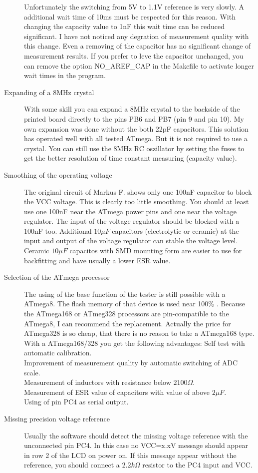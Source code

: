 \begin{description}
Unfortunately the switching from 5V to 1.1V reference is very slowly. A additional
wait time of 10ms must be respected for this reason.
With changing the capacity value to 1nF this wait time can be reduced significant.
I have not noticed any degration of measurement quality with this change.
Even a removing of the capacitor has no significant change of measurement results.
If you prefer to leve the capacitor unchanged, you can remove the option NO\_AREF\_CAP
in the Makefile to activate longer wait times in the program.
\item[Expanding of a 8MHz crystal]
With some skill you can expand a 8MHz crystal to the backside of the printed board
directly to the pins PB6 and PB7 (pin 9 and pin 10).
My own expansion was done without the both 22pF capacitors.
This solution has operated well with all tested ATmega.
But it is not required to use a crystal. You can still use the 8MHz RC oszillator
by setting the fuses to get the better resolution of time constant measuring (capacity value).
\item[Smoothing of the operating voltage]
The original circuit of Markus F. shows only one 100nF capacitor to block the VCC voltage.
This is clearly too little smoothing. You should at least use one 100nF near the ATmega power pins
and one near the voltage regulator. The input of the voltage regulator should be
blocked with a 100nF too.
Additional \(10\mu F\) capacitors (electrolytic or ceramic) at the input and
output of the voltage regulator can stable the voltage level.
Ceramic \(10\mu F\) capacitos with SMD mounting form are easier to use for backfitting
and have usually a lower ESR value. 
\item[Selection of the ATmega processor]
The using of the base function of the tester is still possible with a ATmega8.
The flash memory of that device is used near 100\% .
Because the ATmega168 or ATmeg328 processors are pin-compatible to the ATmega8,
I can recommend the replacement.
Actually the price for ATmega328 is so cheap, that there is no reason to take
a ATmega168 type.
With a ATmega168/328 you get the following advantages:
Self test with automatic calibration.\\
Improvement of measurement quality by automatic switching of ADC scale.\\
Measurement of inductors with resistance  below \(2100 \Omega\).\\
Measurement of ESR value of capacitors with value of above  \(2 \mu F\).\\
Using of pin PC4 as serial output.\\
\item[Missing precision voltage reference]
Usually the software should detect the missing voltage reference with the unconnected pin PC4.
In this case no VCC=x.xV message should appear in row 2 of the LCD on power on.
If this message appear without the reference, you should connect a \(2.2k \Omega\) resistor
to the PC4 input and VCC.


\end{description}

